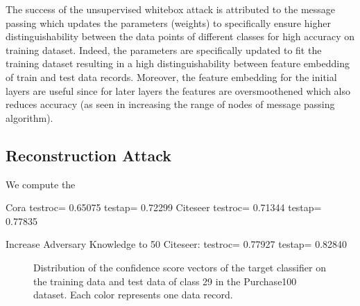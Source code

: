 The success of the unsupervised whitebox attack is attributed to the message passing which updates the parameters (weights) to specifically ensure higher distinguishability between the data points of different classes for high accuracy on training dataset.
Indeed, the parameters are specifically updated to fit the training dataset resulting in a high distinguishability between feature embedding of train and test data records.
Moreover, the feature embedding for the initial layers are useful since for later layers the features are oversmoothened which also reduces accuracy (as seen in increasing the range of nodes of message passing algorithm).




\subsection{Reconstruction Attack}

We compute the



Cora testroc= 0.65075 testap= 0.72299
Citeseer testroc= 0.71344 testap= 0.77835

Increase Adversary Knowledge to 50%
Citeseer: testroc= 0.77927 testap= 0.82840

\begin{figure}[!htb]
    \centering
    \begin{minipage}[b]{1\linewidth}
    \centering
    \end{minipage}
    \caption{Distribution of the confidence score vectors of the target classifier on the training data and test data of class 29 in the Purchase100 dataset. Each color represents one data record.}
    \label{fig:soft_label}
\end{figure}

